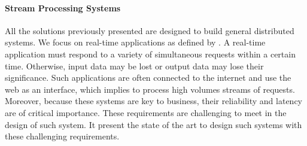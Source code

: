 
\paragraph{Stream Processing Systems} \label{chapter3:parallel-execution:stream-processing}

All the solutions previously presented are designed to build general distributed systems.
We focus on real-time applications as defined by \cite{Hansen1978}.
A real-time application must respond to a variety of simultaneous requests within a certain time.
Otherwise, input data may be lost or output data may lose their significance.
Such applications are often connected to the internet and use the web as an interface, which implies to process high volumes streams of requests.
Moreover, because these systems are key to business, their reliability and latency are of critical importance.
These requirements are challenging to meet in the design of such system.
It present the state of the art to design such systems with these challenging requirements.




